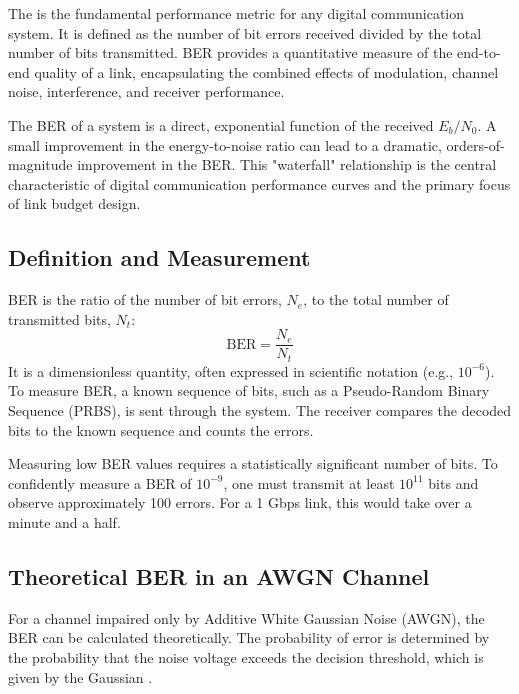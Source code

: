 The  is the fundamental performance metric for any digital communication system. It is defined as the number of bit errors received divided by the total number of bits transmitted. BER provides a quantitative measure of the end-to-end quality of a link, encapsulating the combined effects of modulation, channel noise, interference, and receiver performance.

\begin{keyconcept}
    The BER of a system is a direct, exponential function of the received $E_b/N_0$. A small improvement in the energy-to-noise ratio can lead to a dramatic, orders-of-magnitude improvement in the BER. This "waterfall" relationship is the central characteristic of digital communication performance curves and the primary focus of link budget design.
\end{keyconcept}


\subsection{Definition and Measurement}

BER is the ratio of the number of bit errors, $N_e$, to the total number of transmitted bits, $N_t$:
\begin{equation}
    \text{BER} = \frac{N_e}{N_t}
\end{equation}
It is a dimensionless quantity, often expressed in scientific notation (e.g., $10^{-6}$). To measure BER, a known sequence of bits, such as a Pseudo-Random Binary Sequence (PRBS), is sent through the system. The receiver compares the decoded bits to the known sequence and counts the errors.

\begin{warningbox}
    Measuring low BER values requires a statistically significant number of bits. To confidently measure a BER of $10^{-9}$, one must transmit at least $10^{11}$ bits and observe approximately 100 errors. For a 1 Gbps link, this would take over a minute and a half.
\end{warningbox}


\subsection{Theoretical BER in an AWGN Channel}

For a channel impaired only by Additive White Gaussian Noise (AWGN), the BER can be calculated theoretically. The probability of error is determined by the probability that the noise voltage exceeds the decision threshold, which is given by the Gaussian .

